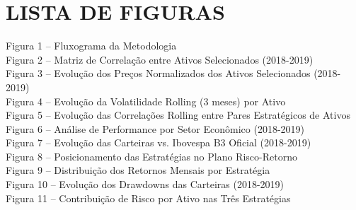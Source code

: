 
\chapter*{LISTA DE FIGURAS}

\vspace{1cm}

\noindent
Figura 1 -- Fluxograma da Metodologia \\
Figura 2 -- Matriz de Correlação entre Ativos Selecionados (2018-2019) \\
Figura 3 -- Evolução dos Preços Normalizados dos Ativos Selecionados (2018-2019) \\
Figura 4 -- Evolução da Volatilidade Rolling (3 meses) por Ativo \\
Figura 5 -- Evolução das Correlações Rolling entre Pares Estratégicos de Ativos \\
Figura 6 -- Análise de Performance por Setor Econômico (2018-2019) \\
Figura 7 -- Evolução das Carteiras vs. Ibovespa B3 Oficial (2018-2019) \\
Figura 8 -- Posicionamento das Estratégias no Plano Risco-Retorno \\
Figura 9 -- Distribuição dos Retornos Mensais por Estratégia \\
Figura 10 -- Evolução dos Drawdowns das Carteiras (2018-2019) \\
Figura 11 -- Contribuição de Risco por Ativo nas Três Estratégias 